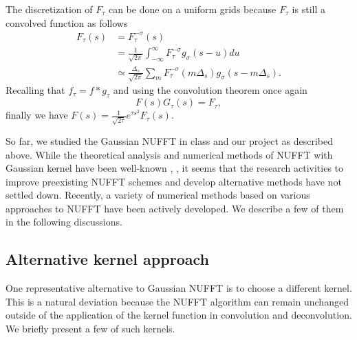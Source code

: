 The discretization of $F_{\tau}$ can be done on a uniform grids because $F_{\tau}$ is still a convolved function as follows
\begin{align}
     F_{\tau}(s)
  &= F_{\tau}^{-\sigma}(s) \\
  &= \frac{1}{\sqrt{2\pi}}\int_{-\infty}^{\infty}F_{\tau}^{-\sigma}g_{\sigma}(s-u)du \\
  &\simeq \frac{\Delta_{s}}{\sqrt{2\pi}}\sum_{m}^{}F_{\tau}^{-\sigma}(m\Delta_{s})
          g_{\sigma}(s - m\Delta_{s}).
\end{align}
Recalling that $f_{\tau} = f\ast g_{\tau}$ and using the convolution theorem once again
\begin{equation}
  F(s)G_{\tau}(s) = F_{\tau},
\end{equation}
finally we have $F(s) = \frac{1}{\sqrt{2\tau}}e^{\tau s^2}F_{\tau}(s)$.

So far, we studied the Gaussian NUFFT in class and our project as described above.
While the theoretical analysis and numerical methods of NUFFT with Gaussian kernel have been well-known \cite{SISC-1993-Dutt-Rokhlin}, \cite{SIAM-Rev-2004-Greengard}, it seems that the research activities to improve preexisting NUFFT schemes and develop alternative methods have not settled down.
Recently, a variety of numerical methods based on various approaches to NUFFT have been actively developed.
We describe a few of them in the following discussions.

\subsection{Alternative kernel approach}
One representative alternative to Gaussian NUFFT is to choose a different kernel.
This is a natural deviation because the NUFFT algorithm can remain unchanged outside of the application of the kernel function in convolution and deconvolution.
We briefly present a few of such kernels.


